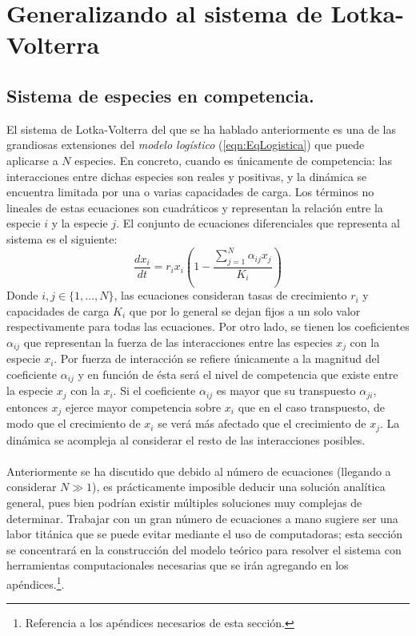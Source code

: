 \chapter{Generalizando al sistema de Lotka-Volterra}

\section{Sistema de especies en competencia.}

\setlength{\parindent}{0cm} El sistema de Lotka-Volterra del que se ha hablado anteriormente es una de las grandiosas extensiones del \textit{modelo logístico} (\ref{eqn:EqLogistica}) que puede aplicarse a $N$ especies. En concreto, cuando es únicamente de competencia: las interacciones entre dichas especies son reales y positivas, y la dinámica se encuentra limitada por una o varias capacidades de carga.  Los términos no lineales de estas ecuaciones son cuadráticos y representan la relación entre la especie $i$ y la especie $j$. El conjunto de ecuaciones diferenciales que representa al sistema es el siguiente:
\begin{equation}\label{eqn:LK}
	\frac{dx_i}{dt}=r_ix_i\left(1-\frac{\sum_{j=1}^N \alpha_{ij}x_j}{K_i}\right)
\end{equation}
Donde $i,j\in\{1,...,N\}$, las ecuaciones consideran tasas de crecimiento $r_i$ y capacidades de carga $K_i$ que por lo general se dejan fijos a un solo valor respectivamente para todas las ecuaciones. Por otro lado, se tienen los coeficientes $\alpha_{ij}$ que representan la fuerza de las interacciones entre las especies $x_j$ con la especie $x_i$. Por fuerza de interacción se refiere únicamente a la magnitud del coeficiente $\alpha_{ij}$ y en función de ésta será el nivel de competencia que existe entre la especie $x_j$ con la $x_i$. Si el coeficiente $\alpha_{ij}$ es mayor que su transpuesto $\alpha_{ji}$, entonces $x_j$ ejerce mayor competencia sobre $x_i$ que en el caso transpuesto, de modo que el crecimiento de $x_i$ se verá más afectado que el crecimiento de $x_j$. La dinámica se acompleja al considerar el resto de las interacciones posibles. \\
\\
Anteriormente se ha discutido que debido al número de ecuaciones (llegando a considerar $N \gg 1$), es prácticamente imposible deducir una solución analítica general, pues bien podrían existir múltiples soluciones \cite{CauchyLipschitzTheorem} muy complejas de determinar. Trabajar con un gran número de ecuaciones a mano sugiere ser una labor titánica que se puede evitar mediante el uso de computadoras; esta sección se concentrará en la construcción del modelo teórico para resolver el sistema con herramientas computacionales necesarias que se irán agregando en los apéndices.\footnote{Referencia a los apéndices necesarios de esta sección.}.
